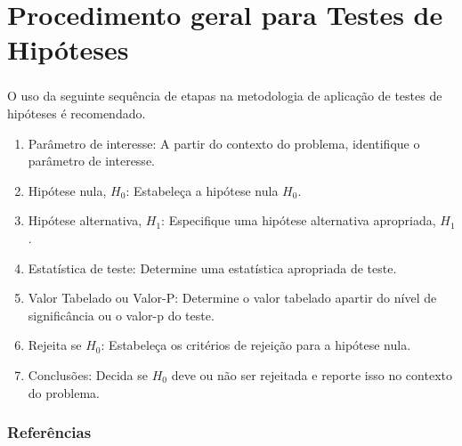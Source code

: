 \documentclass[14pt,aspectratio=1610]{beamer}
\newcommand{\Ho}{\ensuremath{H_{0}}}
\newcommand{\Hi}{\ensuremath{H_{1}}}
\begin{document}
\section{Procedimento geral para Testes de Hipóteses}
\begin{frame}{}
\frametitle{}
\vspace{-0.5cm}
\small
\begin{block}{}
\justifying
O uso da seguinte sequência de etapas na metodologia de aplicação de testes de hipóteses é recomendado.
\begin{enumerate}
	\justifying
\item Parâmetro de interesse: A partir do contexto do problema, identifique o parâmetro de interesse.\pause
\item Hipótese nula, $\Ho$: Estabeleça a hipótese nula $\Ho$. \pause
\item Hipótese alternativa, $\Hi$: Especifique uma hipótese alternativa apropriada, $\Hi$.\pause
\item Estatística de teste: Determine uma estatística apropriada de teste.\pause
\item Valor Tabelado ou Valor-P: Determine o valor tabelado apartir do nível de significância ou o valor-p do teste.\pause
\item Rejeita se $\Ho$: Estabeleça os critérios de rejeição para a hipótese nula.\pause
\item Conclusões: Decida se $\Ho$ deve ou não ser rejeitada e reporte isso no contexto do problema.
\end{enumerate}
\end{block}
\nocite{Morettin09, Apostila, eric, montgomery2016, meyer1982probabilidade, Bastos2025}
\end{frame}

\begin{frame}[allowframebreaks]
\frametitle{\bf Referências}
\printbibliography
\end{frame}
\end{document}
